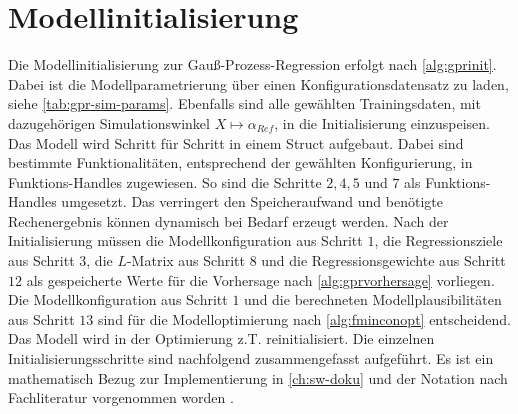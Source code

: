 \clearpage



\section{Modellinitialisierung}\label{sec:gprinit}


Die Modellinitialisierung zur Gauß-Prozess-Regression erfolgt nach \autoref{alg:gprinit}. Dabei ist die Modellparametrierung über einen Konfigurationsdatensatz zu laden, siehe \autoref{tab:gpr-sim-params}. Ebenfalls sind alle gewählten Trainingsdaten, mit dazugehörigen Simulationswinkel $X \mapsto \alpha_{Ref}$, in die Initialisierung einzuspeisen. Das Modell wird Schritt für Schritt in einem Struct aufgebaut. Dabei sind bestimmte Funktionalitäten, entsprechend der gewählten Konfigurierung, in Funktions-Handles zugewiesen. So sind die Schritte $2, 4, 5$ und $7$ als Funktions-Handles umgesetzt. Das verringert den Speicheraufwand und benötigte Rechenergebnis können dynamisch bei Bedarf erzeugt werden. Nach der Initialisierung müssen die Modellkonfiguration aus Schritt $1$, die Regressionsziele aus Schritt $3$, die $L$-Matrix aus Schritt $8$ und die Regressionsgewichte aus Schritt $12$ als gespeicherte Werte für die Vorhersage nach \autoref{alg:gprvorhersage} vorliegen. Die Modellkonfiguration aus Schritt $1$ und die berechneten Modellplausibilitäten aus Schritt $13$ sind für die Modelloptimierung nach \autoref{alg:fminconopt} entscheidend. Das Modell wird in der Optimierung z.T. reinitialisiert. Die einzelnen Initialisierungsschritte sind nachfolgend zusammengefasst aufgeführt. Es ist ein mathematisch Bezug zur Implementierung in \autoref{ch:sw-doku} und der Notation nach Fachliteratur vorgenommen worden \cite{Rasmussen2006}.


